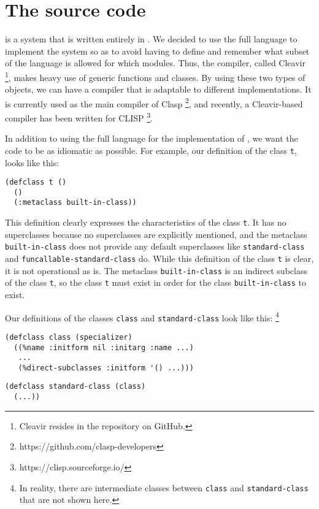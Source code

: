 \section{The \sicl{} source code}

\sicl{} is a system that is written entirely in \commonlisp{}.  We
decided to use the full language to implement the system so as to
avoid having to define and remember what subset of the language is
allowed for which modules.  Thus, the compiler, called Cleavir%
\footnote{Cleavir resides in the \sicl{} repository on GitHub.},
makes heavy use of generic functions and classes.  By using these two
types of objects, we can have a compiler that is adaptable to
different \commonlisp{} implementations.  It is currently used as the
main compiler of Clasp%
\footnote{https://github.com/clasp-developers},
and recently, a Cleavir-based compiler has
been written for CLISP%
\footnote{https://clisp.sourceforge.io/}.

In addition to using the full language for the implementation of
\sicl{}, we want the code to be as idiomatic as possible.  For
example, our definition of the class \texttt{t}, looks like this:

\begin{verbatim}
(defclass t ()
  ()
  (:metaclass built-in-class))
\end{verbatim}

\noindent
This definition clearly expresses the characteristics of the class
\texttt{t}.  It has no superclasses because no superclasses are
explicitly mentioned, and the metaclass \texttt{built-in-class} does
not provide any default superclasses like \texttt{standard-class} and
\texttt{funcallable-standard-class} do.  While this definition of the
class \texttt{t} is clear, it is not operational as is.  The metaclass
\texttt{built-in-class} is an indirect subclass of the class
\texttt{t}, so the class \texttt{t} must exist in order for the class
\texttt{built-in-class} to exist.

Our definitions of the classes \texttt{class} and
\texttt{standard-class} look like this:%
\footnote{In reality, there are intermediate classes between
  \texttt{class} and \texttt{standard-class} that are not shown here.}

\begin{verbatim}
(defclass class (specializer)
  ((%name :initform nil :initarg :name ...)
   ...
   (%direct-subclasses :initform '() ...)))
\end{verbatim}

\begin{verbatim}
(defclass standard-class (class)
  (...))
\end{verbatim}

